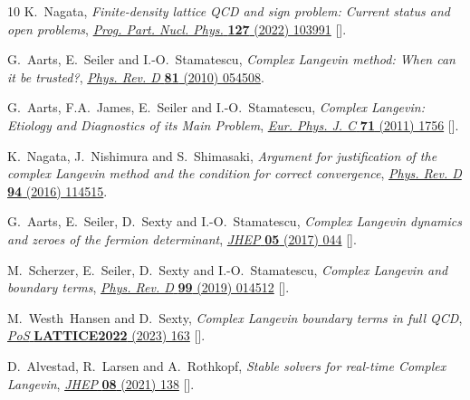 \begin{thebibliography}{10}
K.~Nagata, \emph{{Finite-density lattice QCD and sign problem: Current status
  and open problems}},
  \href{https://doi.org/10.1016/j.ppnp.2022.103991}{\emph{Prog. Part. Nucl.
  Phys.} {\bfseries 127} (2022) 103991}
  [\href{https://arxiv.org/abs/2108.12423}{{}}].

G.~Aarts, E.~Seiler and I.-O.~Stamatescu, \emph{Complex {{Langevin}} method:
  {{When}} can it be trusted?},
  \href{https://doi.org/10.1103/PhysRevD.81.054508}{\emph{Phys. Rev. D}
  {\bfseries 81} (2010) 054508}.

G.~Aarts, F.A.~James, E.~Seiler and I.-O.~Stamatescu, \emph{{Complex Langevin:
  Etiology and Diagnostics of its Main Problem}},
  \href{https://doi.org/10.1140/epjc/s10052-011-1756-5}{\emph{Eur. Phys. J. C}
  {\bfseries 71} (2011) 1756}
  [\href{https://arxiv.org/abs/1101.3270}{{}}].

K.~Nagata, J.~Nishimura and S.~Shimasaki, \emph{Argument for justification of
  the complex {{Langevin}} method and the condition for correct convergence},
  \href{https://doi.org/10.1103/PhysRevD.94.114515}{\emph{Phys. Rev. D}
  {\bfseries 94} (2016) 114515}.

G.~Aarts, E.~Seiler, D.~Sexty and I.-O.~Stamatescu, \emph{{Complex Langevin
  dynamics and zeroes of the fermion determinant}},
  \href{https://doi.org/10.1007/JHEP05(2017)044}{\emph{JHEP} {\bfseries 05}
  (2017) 044} [\href{https://arxiv.org/abs/1701.02322}{{}}].

M.~Scherzer, E.~Seiler, D.~Sexty and I.-O.~Stamatescu, \emph{{Complex Langevin
  and boundary terms}},
  \href{https://doi.org/10.1103/PhysRevD.99.014512}{\emph{Phys. Rev. D}
  {\bfseries 99} (2019) 014512}
  [\href{https://arxiv.org/abs/1808.05187}{{}}].

M.~Westh~Hansen and D.~Sexty, \emph{{Complex Langevin boundary terms in full
  QCD}}, \href{https://doi.org/10.22323/1.430.0163}{\emph{PoS} {\bfseries
  LATTICE2022} (2023) 163} [\href{https://arxiv.org/abs/2212.12029}{{}}].

D.~Alvestad, R.~Larsen and A.~Rothkopf, \emph{{Stable solvers for real-time
  Complex Langevin}},
  \href{https://doi.org/10.1007/JHEP08(2021)138}{\emph{JHEP} {\bfseries 08}
  (2021) 138} [\href{https://arxiv.org/abs/2105.02735}{{}}].


\end{thebibliography}
